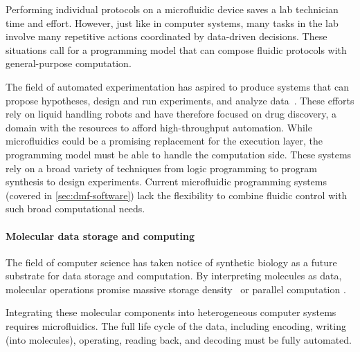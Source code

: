 \documentclass[sigconf, screen]{acmart}
\begin{document}
Performing individual protocols on a microfluidic device saves a lab technician time and effort.
However, just like in computer systems, many tasks in the lab involve many repetitive actions coordinated by data-driven decisions.
These situations call for a programming model that can compose fluidic protocols with general-purpose computation.

The field of automated experimentation has aspired to produce systems that can propose hypotheses, design and run experiments, and analyze data~\cite{king85, king2004, schneider2017automating, sparkes2010towards}.
These efforts rely on liquid handling robots and have therefore focused on drug discovery, a domain with the resources to afford high-throughput automation.
While microfluidics could be a promising replacement for the execution layer, the programming model must be able to handle the computation side.
These systems rely on a broad variety of techniques from logic programming \cite{king85} to program synthesis \cite{koksal2013} to design experiments.
Current microfluidic programming systems (covered in \autoref{sec:dmf-software}) lack the flexibility to combine fluidic control with such broad computational needs.

\paragraph{Molecular data storage and computing}

The field of computer science has taken notice of synthetic biology as a future substrate for data storage and computation.
By interpreting molecules as data, molecular operations promise massive storage density~\cite{nbt, goldman2013towards} or parallel computation \cite{stewart18, qian2011scaling}.

Integrating these molecular components into heterogeneous computer systems requires microfluidics.
The full life cycle of the data, including encoding, writing (into molecules), operating, reading back, and decoding must be fully automated.
\end{document}
